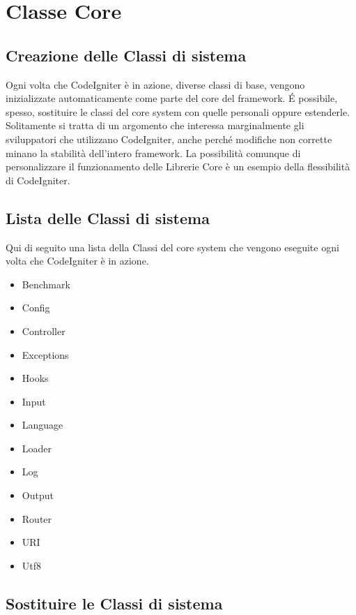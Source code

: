 \chapter{Classe Core}
\label{cap:classecore}

\section{Creazione delle Classi di sistema}

Ogni volta che CodeIgniter è in azione, diverse classi di base, vengono inizializzate automaticamente come parte del core del framework. \'E possibile, spesso, sostituire le classi del core system con quelle personali oppure estenderle. Solitamente si tratta di un argomento che interessa marginalmente gli sviluppatori che utilizzano CodeIgniter, anche perché modifiche non corrette minano la stabilità dell'intero framework. La possibilità comunque di personalizzare il funzionamento delle Librerie Core è un esempio della flessibilità di CodeIgniter.

\section{Lista delle Classi di sistema}

Qui di seguito una lista della Classi del core system che vengono eseguite ogni volta che CodeIgniter è in azione.

\begin{itemize}
\item Benchmark
\item Config
\item Controller
\item Exceptions
\item Hooks
\item Input
\item Language
\item Loader
\item Log
\item Output
\item Router
\item URI
\item Utf8
\end{itemize}

\section{Sostituire le Classi di sistema}

